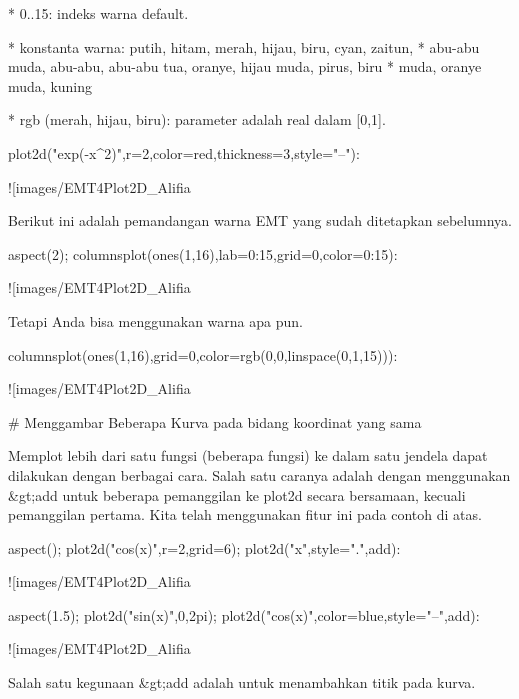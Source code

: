 \documentclass{article}
\begin{document}
* 
0..15: indeks warna default.

* 
konstanta warna: putih, hitam, merah, hijau, biru, cyan, zaitun,
* abu-abu muda, abu-abu, abu-abu tua, oranye, hijau muda, pirus, biru
* muda, oranye muda, kuning

* 
rgb (merah, hijau, biru): parameter adalah real dalam [0,1].


\>plot2d("exp(-x^2)",r=2,color=red,thickness=3,style="--"):


![images/EMT4Plot2D_Alifia%

Berikut ini adalah pemandangan warna EMT yang sudah ditetapkan
sebelumnya.


\>aspect(2); columnsplot(ones(1,16),lab=0:15,grid=0,color=0:15):


![images/EMT4Plot2D_Alifia%

Tetapi Anda bisa menggunakan warna apa pun.


\>columnsplot(ones(1,16),grid=0,color=rgb(0,0,linspace(0,1,15))):


![images/EMT4Plot2D_Alifia%

# Menggambar Beberapa Kurva pada bidang koordinat yang sama

Memplot lebih dari satu fungsi (beberapa fungsi) ke dalam satu jendela
dapat dilakukan dengan berbagai cara. Salah satu caranya adalah dengan
menggunakan &gt;add untuk beberapa pemanggilan ke plot2d secara
bersamaan, kecuali pemanggilan pertama. Kita telah menggunakan fitur
ini pada contoh di atas.


\>aspect(); plot2d("cos(x)",r=2,grid=6); plot2d("x",style=".",\>add):


![images/EMT4Plot2D_Alifia%

\>aspect(1.5); plot2d("sin(x)",0,2pi); plot2d("cos(x)",color=blue,style="--",\>add):


![images/EMT4Plot2D_Alifia%

Salah satu kegunaan &gt;add adalah untuk menambahkan titik pada kurva.
\end{document}

